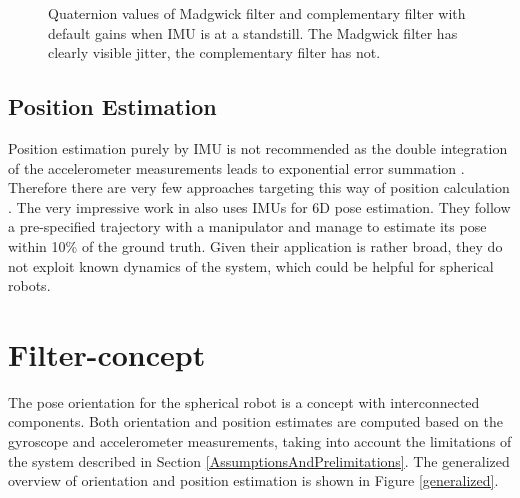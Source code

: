 \documentclass[letterpaper, 10 pt, conference]{ieeeconf}  %
\begin{document}
\begin{figure}
\caption{Quaternion values of Madgwick filter and complementary filter with default gains when IMU is at a standstill. The Madgwick filter has clearly visible jitter, the complementary filter has not.}
\label{madgVsComp1}
\end{figure}



\subsection{Position Estimation}
Position estimation purely by IMU is not recommended as the double integration of the accelerometer measurements leads to exponential error summation \cite{thong2004numerical}.
Therefore there are very few approaches targeting this way of position calculation \cite{kok2017IMU}.
The very impressive work in \cite{valencia2017simpleIMU} also uses IMUs for 6D pose estimation.
They follow a pre-specified trajectory with a manipulator and manage to estimate its pose within 10\% of the ground truth.
Given their application is rather broad, they do not exploit known dynamics of the system, which could be helpful for spherical robots.


\section{Filter-concept}
The pose orientation for the spherical robot is a concept with interconnected components.
Both orientation and position estimates are computed based on the gyroscope and accelerometer measurements, taking into account the limitations of the system described in Section \ref{AssumptionsAndPrelimitations}.
The generalized overview of orientation and position estimation is shown in Figure \ref{generalized}.
\end{document}
